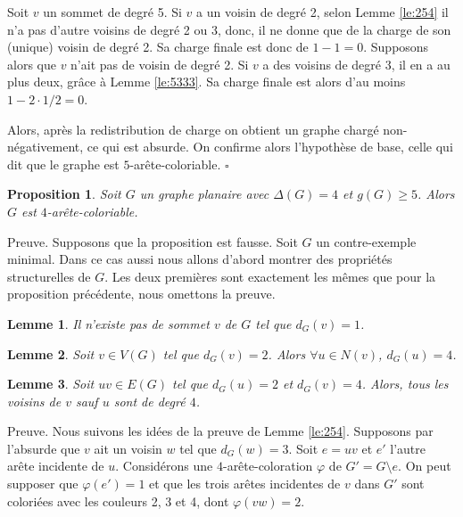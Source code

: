 \documentclass[10pt,a4paper]{article}
\newtheorem{proposition}{Proposition}
\newtheorem{lemme}{Lemme}
\newcommand{\ep}{{\hfill $\square$}}
\begin{document}
Soit $v$ un sommet de degré 5. Si $v$ a un voisin de degré 2, selon Lemme \ref{le:254} il n'a pas d'autre voisins de degré 2 ou 3, donc, il ne donne que de la charge de son (unique) voisin de degré 2. Sa charge finale est donc de $1-1=0$.
Supposons alors que $v$ n'ait pas de voisin de degré 2. Si $v$ a des voisins de degré 3, il en a au plus deux, grâce à Lemme \ref{le:5333}. Sa charge finale est alors d'au moins $1-2\cdot 1/2 = 0$. 

Alors, après la redistribution de charge on obtient un graphe chargé non-négativement, ce qui est absurde. On confirme alors l'hypothèse de base, celle qui dit que le graphe est $5$-arête-coloriable.
\ep



\begin{proposition}
Soit $G$ un graphe planaire avec $\Delta(G) = 4$ et $g(G) \geq 5$. Alors $G$ est $4$-arête-coloriable.
\end{proposition}

Preuve. Supposons que la proposition est fausse. Soit $G$ un contre-exemple minimal. Dans ce cas aussi nous allons d'abord montrer des propriétés structurelles de $G$. Les deux premières sont exactement les mêmes que pour la proposition précédente, nous omettons la preuve.

\begin{lemme}
Il n'existe pas de sommet $v$ de $G$ tel que $d_G(v) = 1$.
\label{le:14}
\end{lemme}

\begin{lemme}
Soit $v \in V(G)$ tel que $d_G(v) = 2$. Alors $\forall u \in N(v)$, $d_G(u) = 4$.
\label{le:23}
\end{lemme} 


\begin{lemme}
Soit $uv \in E(G)$ tel que $d_G(u) = 2$ et $d_G(v) = 4$. Alors, tous les voisins de $v$ sauf $u$ sont de degré $4$.
\label{le:243}
\end{lemme}

Preuve. Nous suivons les idées de la preuve de Lemme \ref{le:254}.
Supposons par l'absurde que $v$ ait un voisin $w$ tel que $d_G(w) = 3$. Soit $e = uv$ et $e'$ l'autre arête incidente de $u$. Considérons une $4$-arête-coloration $\varphi$ de $G' = G \setminus e$. On peut supposer que $\varphi(e') = 1$ et que les trois arêtes incidentes de $v$ dans $G'$ sont coloriées avec les couleurs 2, 3 et 4, dont $\varphi(vw) = 2$.
\end{document}
